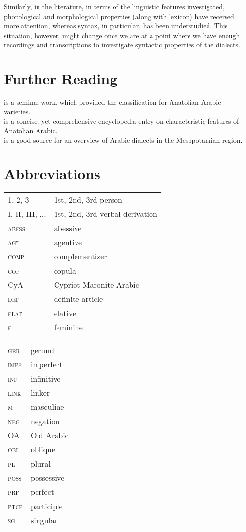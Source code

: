 \documentclass[output=paper]{langsci/langscibook}
\begin{document}
Similarly, in the literature, in terms of the linguistic features investigated, phonological and morphological properties (along with lexicon) have received more attention, whereas syntax, in particular, has been understudied. This situation, however, might change once we are at a point where we have enough recordings and transcriptions to investigate syntactic properties of the dialects. 

\section*{Further Reading}
 
\citet{Jastrow1978} is a seminal work, which provided the classification for Anatolian Arabic varieties. \\
\citet{Jastrow2011anatolian} is a concise, yet comprehensive encyclopedia entry on characteristic features of Anatolian Arabic.\\
\noindent \citet{Talay2011} is a good source for an overview of Arabic dialects in the Mesopotamian region.


\section*{Abbreviations}

\begin{tabularx}{.45\textwidth}{lQ}
\textsc{1, 2, 3} & 1st, 2nd, 3rd person \\
\textsc{I, II, III, ...} & 1st, 2nd, 3rd verbal derivation \\
\textsc{abess} & abessive \\
\textsc{agt} & agentive \\
\textsc{comp} & complementizer \\
\textsc{cop} & copula \\
CyA & Cypriot Maronite Arabic \\
\textsc{def} & definite article \\
\textsc{elat} & elative \\
\textsc{f} & feminine \\
\end{tabularx}
\begin{tabularx}{.45\textwidth}{lQ}
\textsc{ger} & gerund \\
\textsc{impf} & imperfect \\
\textsc{inf} & infinitive \\
\textsc{link} & linker \\
\textsc{m} & masculine \\
\textsc{neg} & negation  \\
OA & Old Arabic \\
\textsc{obl} & oblique \\
\textsc{pl} & plural \\
\textsc{poss} & possessive  \\
\textsc{prf} & perfect \\
\textsc{ptcp} & participle \\
\textsc{sg} & singular \\

\end{tabularx}
\end{document}

